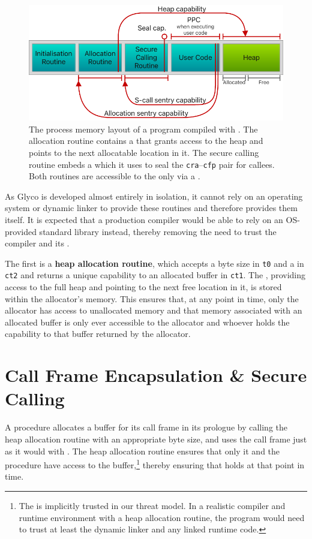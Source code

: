 \documentclass[main.tex]{subfiles}
\begin{document}
\begin{figure}
	\centering
	\includegraphics{Images/GHSCC Process Memory.pdf}
	\caption{The process memory layout of a program compiled with . The allocation routine contains a  that grants access to the heap and points to the next allocatable location in it. The secure calling routine embeds a  which it uses to seal the \texttt{cra}–\texttt{cfp} pair for callees. Both routines are accessible to the  only via a .}
	\label{fig:procmem}
\end{figure}

As Glyco is developed almost entirely in isolation, it cannot rely on an operating system or dynamic linker to provide these routines and therefore provides them itself. It is expected that a production compiler would be able to rely on an OS-provided standard library instead, thereby removing the need to trust the compiler and its .

The first  is a \textbf{heap allocation routine}, which accepts a byte size in \texttt{t0} and a  in \texttt{ct2} and returns a unique capability to an allocated buffer in \texttt{ct1}. The , providing access to the full heap and pointing to the next free location in it, is stored within the allocator's memory. This ensures that, at any point in time, only the allocator has access to unallocated memory and that memory associated with an allocated buffer is only ever accessible to the allocator and whoever holds the capability to that buffer returned by the allocator.

\section{Call Frame Encapsulation \& Secure Calling} \label{sct:ghscc}
A procedure allocates a buffer for its call frame in its prologue by calling the heap allocation routine with an appropriate byte size, and uses the call frame just as it would with . The heap allocation routine ensures that only it and the procedure have access to the buffer,\footnote{The  is implicitly trusted in our threat model. In a realistic compiler and runtime environment with a heap allocation routine, the program would need to trust at least the dynamic linker and any linked runtime code.} thereby ensuring that  holds at that point in time.
\end{document}

